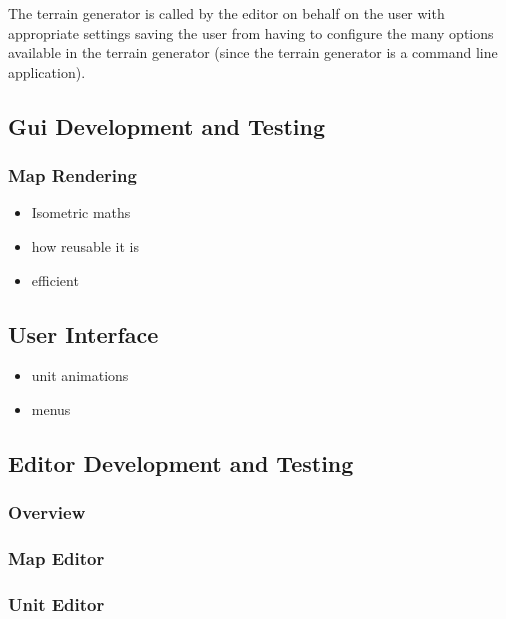 The terrain generator is called by the editor on behalf on the user with appropriate settings saving the user from having to configure the many options available in the terrain generator (since the terrain generator is a command line application).

\subsection{Gui Development and Testing}

\subsubsection{Map Rendering}
\label{ssub:map_rendering}

\begin{itemize}
	\item Isometric maths
	\item how reusable it is
	\item efficient 
\end{itemize}

\subsection{User Interface}

\begin{itemize}
	\item unit animations
	\item menus
\end{itemize}


\subsection{Editor Development and Testing}

\subsubsection{Overview}
\label{ssub:overview}

\subsubsection{Map Editor}
\label{ssub:map_editor}

\subsubsection{Unit Editor}
\label{ssub:unit_editors}

